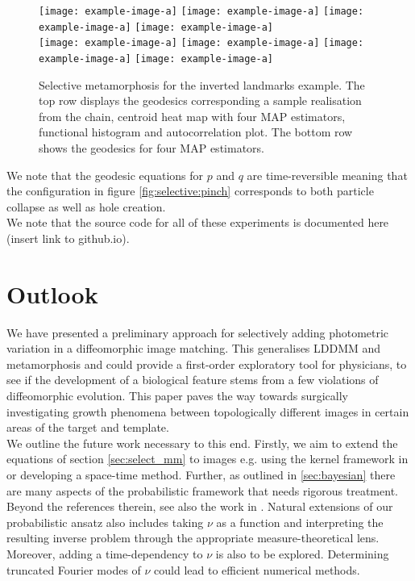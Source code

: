 \documentclass[runningheads]{llncs}
\begin{document}
\begin{figure}
\centering
\begin{minipage}{\textwidth}
  \centering
    \texttt{[image: example-image-a]}
    \texttt{[image: example-image-a]}
    \texttt{[image: example-image-a]}
    \texttt{[image: example-image-a]}\\[0.25cm]
    \texttt{[image: example-image-a]}
    \texttt{[image: example-image-a]}
    \texttt{[image: example-image-a]}
    \texttt{[image: example-image-a]}
    \caption{Selective metamorphosis for the inverted landmarks example. The top
    row displays the geodesics corresponding a sample realisation from the
    chain, centroid heat map with four MAP estimators, functional histogram and
    autocorrelation plot. The bottom row shows the geodesics for four MAP
    estimators.}
    \label{fig:selective:triangle}
\end{minipage}
\end{figure}

We note that the geodesic equations for $p$ and $q$ are time-reversible meaning
that the configuration in figure \ref{fig:selective:pinch} corresponds to both
particle collapse as well as hole creation.\\

We note that the source code for all of these experiments is documented
here (insert link to github.io).

\section{Outlook}\label{sec:outlook}

We have presented a preliminary approach for selectively adding photometric
variation in a diffeomorphic image matching. This generalises LDDMM and
metamorphosis and  could provide a first-order exploratory tool for physicians,
to see if the development of a biological feature stems from a few violations of
diffeomorphic evolution. This paper paves the way towards surgically
investigating growth phenomena between topologically different images in certain
areas of the target and template.\\

We outline the future work necessary to this end. Firstly, we aim to extend the
equations of section \ref{sec:select_mm} to images e.g. using the kernel
framework in \cite{richardson2016metamorphosis} or developing a space-time
method. Further, as outlined in \ref{sec:bayesian} there are many aspects of the
probabilistic framework that needs rigorous treatment. Beyond the references
therein, see also the work in \cite{dashti2013map}. Natural extensions of our
probabilistic ansatz also includes taking $\nu$ as a function and interpreting
the resulting inverse problem through the appropriate measure-theoretical lens.
Moreover, adding a time-dependency to $\nu$ is also to be explored. Determining
truncated Fourier modes of $\nu$ could lead to efficient numerical methods.\\
\end{document}
